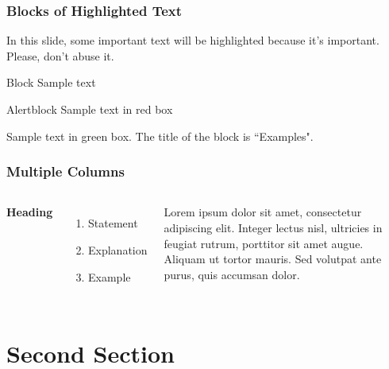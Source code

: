 \documentclass[aspectratio=169,xcolor=dvipsnames]{beamer}
\begin{document}
\begin{frame}
    \frametitle{Blocks of Highlighted Text}
    In this slide, some important text will be \alert{highlighted} because it's important. Please, don't abuse it.

    \begin{block}{Block}
        Sample text
    \end{block}

    \begin{alertblock}{Alertblock}
        Sample text in red box
    \end{alertblock}

    \begin{examples}
        Sample text in green box. The title of the block is ``Examples".
    \end{examples}
\end{frame}


\begin{frame}
    \frametitle{Multiple Columns}
    \begin{columns}[c] %

        \textbf{Heading}
        \begin{enumerate}
            \item Statement
            \item Explanation
            \item Example
        \end{enumerate}

        Lorem ipsum dolor sit amet, consectetur adipiscing elit. Integer lectus nisl, ultricies in feugiat rutrum, porttitor sit amet augue. Aliquam ut tortor mauris. Sed volutpat ante purus, quis accumsan dolor.

    \end{columns}
\end{frame}

\section{Second Section}
\end{document}
